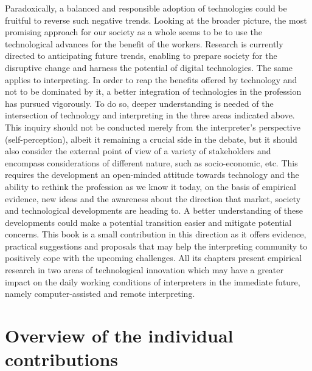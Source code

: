 \documentclass[output=paper]{langsci/langscibook}
\begin{document}
Paradoxically, a balanced and responsible adoption of technologies could be fruitful to reverse such negative trends. Looking at the broader picture, the most promising approach for our society as a whole seems to be to use the technological advances for the benefit of the workers. Research is currently directed to anticipating future trends, enabling to prepare society for the disruptive change and harness the potential of digital technologies. The same applies to interpreting. In order to reap the benefits offered by technology and not to be dominated by it, a better integration of technologies in the profession has pursued vigorously. To do so, deeper understanding is needed of  the intersection of technology and interpreting in the three areas indicated above. This inquiry should not be conducted merely from the interpreter’s perspective (self-perception), albeit it remaining a crucial side in the debate, but it should also consider the external point of view of a variety of stakeholders and encompass considerations of different nature, such as socio-economic, etc. This requires the development an open-minded attitude towards technology and the ability to rethink the profession as we know it today, on the basis of empirical evidence, new ideas and the awareness about the direction that market, society and technological developments are heading to. A better understanding of these developments could make a potential transition easier and mitigate potential concerns. 
This book is a small contribution in this direction as it offers evidence, practical suggestions and proposals that may help the interpreting community to positively cope with the upcoming challenges. All its chapters present empirical research in two areas of technological innovation which may have a greater impact on the daily working conditions of interpreters in the immediate future, namely computer-assisted and remote interpreting. 
 
\section{Overview of the individual contributions} 
 
\end{document}
